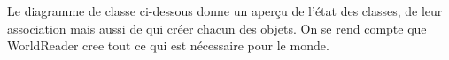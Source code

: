 Le diagramme de classe ci-dessous donne un aperçu de l'état des classes, de leur association mais aussi de qui créer chacun des objets.
\ml
On se rend compte que WorldReader cree tout ce qui est nécessaire pour le monde.

